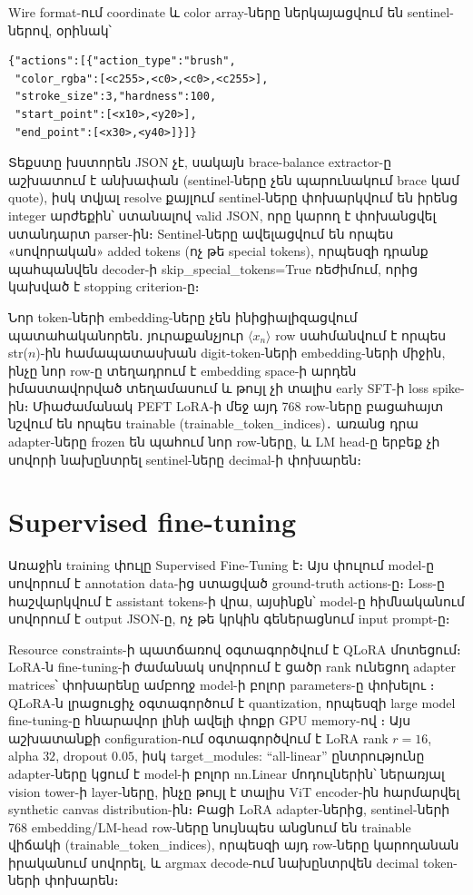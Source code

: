 \documentclass[12pt,a4paper]{report}
\newcommand{\Eng}[1]{\textenglish{#1}}
\begin{document}
Wire format-ում coordinate և color array-ները ներկայացվում են sentinel-ներով, օրինակ՝
\begin{lstlisting}[style=code]
{"actions":[{"action_type":"brush",
 "color_rgba":[<c255>,<c0>,<c0>,<c255>],
 "stroke_size":3,"hardness":100,
 "start_point":[<x10>,<y20>],
 "end_point":[<x30>,<y40>]}]}
\end{lstlisting}

Տեքստը խստորեն \Eng{JSON} չէ, սակայն brace-balance extractor-ը աշխատում է անխափան (sentinel-ները չեն պարունակում brace կամ quote), իսկ տվյալ resolve քայլում sentinel-ները փոխարկվում են իրենց integer արժեքին՝ ստանալով valid \Eng{JSON}, որը կարող է փոխանցվել ստանդարտ parser-ին։ Sentinel-ները ավելացվում են որպես «սովորական» added tokens (ոչ թե \Eng{special tokens}), որպեսզի դրանք պահպանվեն decoder-ի \Eng{skip\_special\_tokens=True} ռեժիմում, որից կախված է stopping criterion-ը։

Նոր token-ների embedding-ները չեն ինիցիալիզացվում պատահականորեն․ յուրաքանչյուր $\langle x_n \rangle$ row սահմանվում է որպես \Eng{str($n$)}-ին համապատասխան digit-token-ների embedding-ների միջին, ինչը նոր row-ը տեղադրում է embedding space-ի արդեն իմաստավորված տեղամասում և թույլ չի տալիս early SFT-ի loss spike-ին։ Միաժամանակ \Eng{PEFT LoRA}-ի մեջ այդ 768 row-ները բացահայտ նշվում են որպես trainable (\Eng{trainable\_token\_indices})․ առանց դրա adapter-ները frozen են պահում նոր row-ները, և LM head-ը երբեք չի սովորի նախընտրել sentinel-ները decimal-ի փոխարեն։

\section{Supervised fine-tuning}

Առաջին training փուլը \Eng{Supervised Fine-Tuning} է։ Այս փուլում model-ը սովորում է annotation data-ից ստացված ground-truth actions-ը։ Loss-ը հաշվարկվում է assistant tokens-ի վրա, այսինքն՝ model-ը հիմնականում սովորում է output JSON-ը, ոչ թե կրկին գեներացնում input prompt-ը։

Resource constraints-ի պատճառով օգտագործվում է \Eng{QLoRA} մոտեցում։ \Eng{LoRA}-ն fine-tuning-ի ժամանակ սովորում է ցածր rank ունեցող adapter matrices՝ փոխարենը ամբողջ model-ի բոլոր parameters-ը փոխելու \cite{Hu2022}։ \Eng{QLoRA}-ն լրացուցիչ օգտագործում է quantization, որպեսզի large model fine-tuning-ը հնարավոր լինի ավելի փոքր GPU memory-ով \cite{Dettmers2023}։ Այս աշխատանքի configuration-ում օգտագործվում է LoRA rank $r=16$, alpha $32$, dropout $0.05$, իսկ \Eng{target\_modules: ``all-linear''} ընտրությունը adapter-ները կցում է model-ի բոլոր \Eng{nn.Linear} մոդուլներին՝ ներառյալ vision tower-ի layer-ները, ինչը թույլ է տալիս ViT encoder-ին հարմարվել synthetic canvas distribution-ին։ Բացի LoRA adapter-ներից, sentinel-ների 768 embedding/LM-head row-ները նույնպես անցնում են trainable վիճակի (\Eng{trainable\_token\_indices}), որպեսզի այդ row-ները կարողանան իրականում սովորել, և argmax decode-ում նախընտրվեն decimal token-ների փոխարեն։
\end{document}
